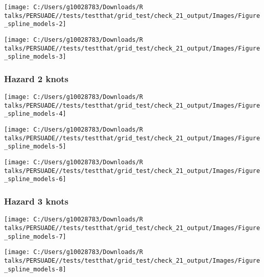 \documentclass[
]{article}
\begin{document}
\begin{flushleft}\texttt{[image: C:/Users/g10028783/Downloads/R talks/PERSUADE//tests/testthat/grid\_test/check\_21\_output/Images/Figure\_spline\_models-2]} \end{flushleft}

\begin{flushleft}\texttt{[image: C:/Users/g10028783/Downloads/R talks/PERSUADE//tests/testthat/grid\_test/check\_21\_output/Images/Figure\_spline\_models-3]} \end{flushleft}

\clearpage

\subsubsection{Hazard 2 knots}\label{hazard-2-knots}

\begin{flushleft}\texttt{[image: C:/Users/g10028783/Downloads/R talks/PERSUADE//tests/testthat/grid\_test/check\_21\_output/Images/Figure\_spline\_models-4]} \end{flushleft}

\begin{flushleft}\texttt{[image: C:/Users/g10028783/Downloads/R talks/PERSUADE//tests/testthat/grid\_test/check\_21\_output/Images/Figure\_spline\_models-5]} \end{flushleft}

\begin{flushleft}\texttt{[image: C:/Users/g10028783/Downloads/R talks/PERSUADE//tests/testthat/grid\_test/check\_21\_output/Images/Figure\_spline\_models-6]} \end{flushleft}

\clearpage

\subsubsection{Hazard 3 knots}\label{hazard-3-knots}

\begin{flushleft}\texttt{[image: C:/Users/g10028783/Downloads/R talks/PERSUADE//tests/testthat/grid\_test/check\_21\_output/Images/Figure\_spline\_models-7]} \end{flushleft}

\begin{flushleft}\texttt{[image: C:/Users/g10028783/Downloads/R talks/PERSUADE//tests/testthat/grid\_test/check\_21\_output/Images/Figure\_spline\_models-8]} \end{flushleft}
\end{document}
